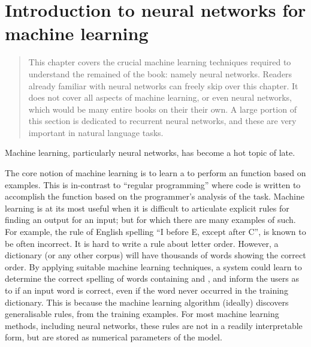 \documentclass[12pt,parskip]{komatufte}
\begin{document}
	

\chapter{Introduction to neural networks for machine learning}\label{sec:machine-learning-for-representations}


\begin{abstract}
	This chapter covers the crucial machine learning techniques required to understand the remained of the book: namely neural networks.
	Readers already familiar with neural networks can freely skip over this chapter.
	It does not cover all aspects of machine learning, or even neural networks, which would be many entire books on their their own.
	A large portion of this section is dedicated to recurrent neural networks, and these are very important in natural language tasks.
\end{abstract}

Machine learning, particularly neural networks, has become a hot topic of late.


The core notion of machine learning is to learn a to perform an function based on examples.
This is in-contrast to ``regular programming'' where code is written to accomplish the function based on the programmer's analysis of the task.
Machine learning is at its most useful when it is difficult to articulate explicit rules for finding an output for an input; but for which there are many examples of such.
For example, the rule of English spelling ``I before E, except after C'', is known to be often incorrect.
It is hard to write a rule about letter order.
However, a dictionary (or any other corpus) will have thousands of words showing the correct order.
By applying suitable machine learning techniques,
a system could learn to determine the correct spelling of words containing  and ,
and inform the users as to if an input word is correct, even if the word never occurred in the training dictionary.
This is because the machine learning algorithm (ideally) discovers generalisable rules, from the training examples.
For most machine learning methods, including neural networks, these rules are not in a readily interpretable form, but are stored as numerical parameters of the model.
\end{document}

